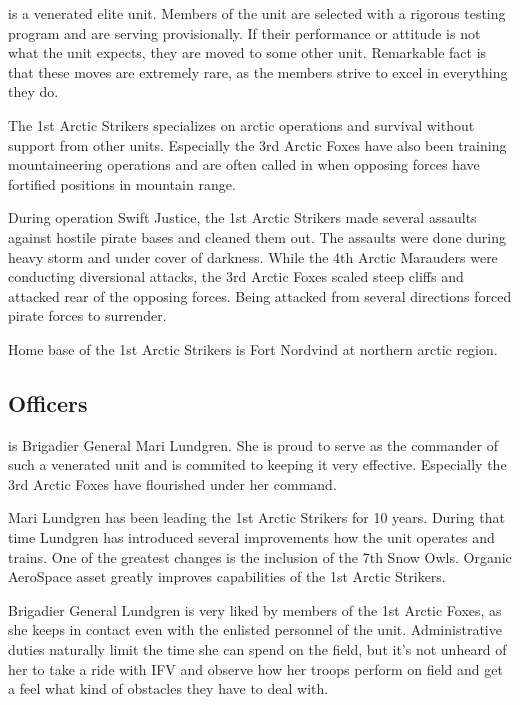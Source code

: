 \documentclass{tufte-book}
\begin{document}
 is a venerated elite unit. Members of the unit
are selected with a rigorous testing program and are serving provisionally.
If their performance or attitude is not what the unit expects, they are moved
to some other unit. Remarkable fact is that these moves are extremely rare,
as the members strive to excel in everything they do.

The 1st Arctic Strikers specializes on arctic operations and survival without
support from other units. Especially the 3rd Arctic Foxes have also been
training mountaineering operations and are often called in when opposing
forces have fortified positions in mountain range.

During operation Swift Justice, the 1st Arctic Strikers made several assaults
against hostile pirate bases and cleaned them out. The assaults were done
during heavy storm and under cover of darkness. While the 4th Arctic Marauders
were conducting diversional attacks, the 3rd Arctic Foxes scaled steep cliffs
and attacked rear of the opposing forces. Being attacked from several
directions forced pirate forces to surrender.

Home base of the 1st Arctic Strikers is Fort Nordvind at northern arctic
region.

\subsection{Officers}

 is Brigadier General Mari
Lundgren. She is proud to serve as the commander of such a venerated unit and
is commited to keeping it very effective. Especially the 3rd Arctic
Foxes have flourished under her command.

Mari Lundgren has been leading the 1st Arctic Strikers for 10 years. During
that time Lundgren has introduced several improvements how the unit operates
and trains. One of the greatest changes is the inclusion of the 7th Snow Owls.
Organic AeroSpace asset greatly improves capabilities of the 1st Arctic
Strikers.

Brigadier General Lundgren is very liked by members of the 1st Arctic Foxes,
as she keeps in contact even with the enlisted personnel of the unit.
Administrative duties naturally limit the time she can spend on the field,
but it's not unheard of her to take a ride with IFV and observe how her troops
perform on field and get a feel what kind of obstacles they have to deal with.
\end{document}
